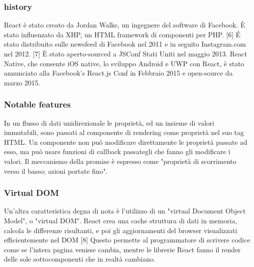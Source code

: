 \subsubsection{history}
React \`e stato creato da Jordan Walke, un ingegnere del software di Facebook. \`E stato influenzato da XHP, un HTML
framework di componenti per PHP. [6] \'E stato distribuito sulle newsfeed di Facebook nel 2011 e in seguito
Instagram.com nel 2012. [7] \`E stato aperto-sourced a JSConf Stati Uniti nel maggio 2013. React Native, che consente
 iOS native, lo sviluppo Android e UWP con React, è stato annunciato alla Facebook's React.js Conf  in
 Febbraio 2015 e open-source da marzo 2015.


\subsubsection{Notable features}
In un flusso di dati unidirezionale le propriet\`a, ed un insieme di valori immutabili, sono passati al
componente di rendering come propriet\`a nel suo tag HTML.
Un componente non pu\`o modificare direttamente le propriet\`a passate ad esso, ma pu\`o usare funzioni di
callback passategli che fanno gli modificare i valori.
Il meccanismo della promise \`e espresso come "proprietà di scorrimento verso il basso; azioni portate fino".

\subsubsection{Virtual DOM}
Un'altra caratteristica degna di nota è l'utilizzo di un "virtual Document Object Model", o "virtual DOM".
React crea una cache struttura di dati in memoria, calcola le differenze risultanti, e poi gli aggiornamenti
del browser visualizzati efficientemente nel DOM [8] Questo permette al programmatore di scrivere codice come se
l'intera pagina venisse cambia, mentre le librerie React fanno il render delle sole sottocomponenti che in realtà cambiano.

